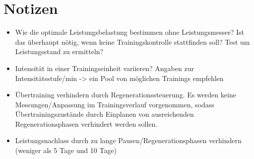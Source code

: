 \section{Notizen}
\begin{itemize}
    \item Wie die optimale Leistungsbelastung bestimmen ohne Leistungsmesser? Ist das überhaupt nötig, wenn keine Trainingskontrolle stattfinden soll? Test um Leistungsstand zu ermitteln?
    \item Intensität in einer Trainingseinheit variieren? Angaben zur Intensitätsstufe/min -> ein Pool von möglichen Trainings empfehlen
    \item Übertraining verhindern durch Regenerationssteuerung. Es werden keine Messungen/Anpassung im Trainingsverlauf vorgenommen, sodass Übertrainingszustände durch Einplanen von ausreichenden Regenerationsphasen verhindert werden sollen.
    \item Leistungsnachlass durch zu lange Pausen/Regenerationsphasen verhindern (weniger als 5 Tage und 10 Tage)
\end{itemize}
